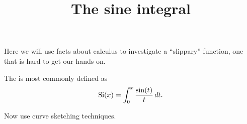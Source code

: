 \documentclass{ximera}
\title[Dig-In:]{The sine integral}
\begin{document}
\begin{abstract}
\end{abstract}
\maketitle

Here we will use facts about calculus to investigate a ``slippary''
function, one that is hard to get our hands on.

\begin{definition}
  The  is most commonly defined as
  \[
  \mathrm{Si}(x) = \int_0^x \frac{\sin(t)}{t}\,d t.
  \]
\end{definition}


Now use curve sketching techniques.
\end{document}
